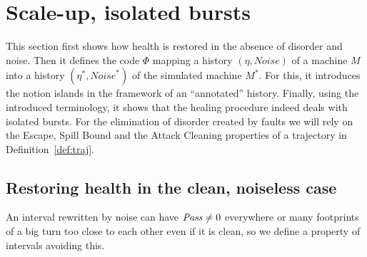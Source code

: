 \documentclass[11pt]{memoir}
\theoremstyle{definition} %
\newcommand{\fld}[1]{\ensuremath{\textit{#1\/}}}
\def\B{B}
\newcommand{\Noise}{\mathit{Noise}}
\newcommand{\Tu}{T}
\newcommand{\Tus}{T^{*}}
\newcommand{\Pass}{\fld{Pass}} %
\begin{document}



\section{Scale-up, isolated bursts}

This section first shows how health is restored in the absence of disorder and noise.
Then it defines the code \( \Phi \) mapping a history \( (\eta,\Noise) \) of a machine \( M \) into a
history \( (\eta^{*},\Noise^{*}) \) of the simulated machine \( M^{*} \).
For this, it introduces the notion islands in the framework of an ``annotated'' history.
Finally, using the introduced terminology,
it shows that the healing procedure indeed deals with isolated bursts.
For the elimination of disorder created by faults
we will rely on the Escape, Spill Bound and the Attack Cleaning
properties of a trajectory in Definition~\ref{def:traj}.

\subsection{Restoring health in the clean, noiseless case}


An interval rewritten by noise can have \( \Pass\ne 0 \) everywhere or many footprints of
a big turn too close to each other even if it is clean, so we define
a property of intervals avoiding this.
\end{document}
